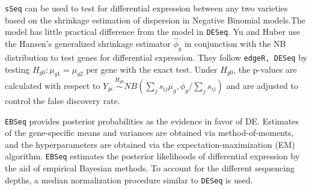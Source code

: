 {\tt sSeq} can be used to test for differential expression between any two varieties based on the shrinkage estimation of dispersion in Negative Binomial models\citep{yu2013sseq}.The model has little practical difference from the model in {\tt DESeq}. Yu and Huber use the Hansen's generalized shrinkage estimator $\hat{\phi}_g$ in conjunction with the NB distribution to test genes for differential expression. They follow {\tt edgeR, DESeq} by testing $H_{g0}: \mu_{g1} = \mu_{g2}$ per gene with the exact test. Under $H_{g0}$, the p-values are calculated with respect to $Y_{gi.} \stackrel{H_{g0}}{\sim} NB(\sum_{j} s_{ij}\mu_{g}, \phi_{g}/\sum_{j} s_{ij})$ and are adjusted to control the false discovery rate\citep{yu2013sseq}. 

{\tt EBSeq} provides posterior probabilities as the evidence in favor of DE. Estimates of the gene-specific means and variances are obtained via method-of-moments, and the hyperparameters are obtained via the expectation-maximization (EM) algorithm\citep{leng2013ebseq}. {\tt EBSeq} estimates the posterior likelihoods of differential expression by the aid of empirical Bayesian methods. To account for the different sequencing depths, a median normalization procedure similar to {\tt DESeq} is used. 